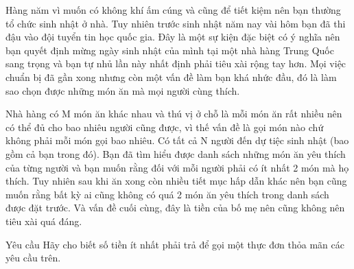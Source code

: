 Hàng năm vì muốn có không khí ấm cúng và cũng để tiết kiệm nên bạn thường tổ chức sinh nhật ở nhà. Tuy nhiên trước sinh nhật năm nay vài hôm bạn đã thi đậu vào đội tuyển tin học quốc gia. Đây là một sự kiện đặc biệt có ý nghĩa nên bạn quyết định mừng ngày sinh nhật của mình tại một nhà hàng Trung Quốc sang trọng và bạn tự nhủ lần này nhất định phải tiêu xài rộng tay hơn. Mọi việc chuẩn bị đã gần xong nhưng còn một vấn đề làm bạn khá nhức đầu, đó là làm sao chọn được những món ăn mà mọi người cùng thích.  

   Nhà hàng có M món ăn khác nhau và thú vị ở chỗ là mỗi món ăn rất nhiều nên có thể đủ cho bao nhiêu người cũng được, vì thế vấn đề là gọi món nào chứ không phải mỗi món gọi bao nhiêu. Có tất cả N người đến dự tiệc sinh nhật (bao gồm cả bạn trong đó). Bạn đã tìm hiểu được danh sách những món ăn yêu thích của từng người và bạn muốn rằng đối với mỗi người phải có ít nhất 2 món mà họ thích. Tuy nhiên sau khi ăn xong còn nhiều tiết mục hấp dẫn khác nên bạn cũng muốn rằng bất kỳ ai cũng không có quá 2 món ăn yêu thích trong danh sách được đặt trước. Và vấn đề cuối cùng, đây là tiền của bố mẹ nên cũng không nên tiêu xài quá đáng.  

Yêu cầu
Hãy cho biết số tiền ít nhất phải trả để gọi một thực đơn thỏa mãn các yêu cầu trên.